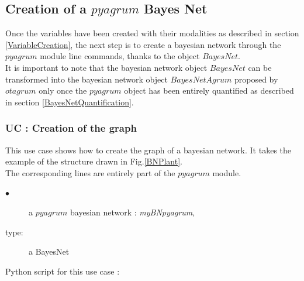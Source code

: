 \newpage \subsection{Creation of a $pyagrum$ Bayes Net} \label{BayesNetCreation}



Once the variables have been created with their modalities as described in section \ref{VariableCreation}, the next step is to create a bayesian network through the $pyagrum$ module line commands, thanks to the object $BayesNet$. \\

It is important to note that the bayesian network object $BayesNet$ can be transformed into the bayesian network object $BayesNetAgrum$ proposed by $otagrum$ only once the $pyagrum$ object has been entirely quantified as described in section \ref{BayesNetQuantification}.\\

\subsubsection{UC : Creation of the graph}

This use case shows how to create the graph of a bayesian network. It takes the example of the structure drawn in Fig.\ref{BNPlant}.\\

The corresponding lines are entirely part of the $pyagrum$ module. \\



{
  \begin{description}
  \item[$\bullet$] a   $pyagrum$ bayesian network : {\itshape myBNpyagrum},
  \item[type:] a BayesNet
  \end{description}
}

\espace 
Python  script for this use case :

